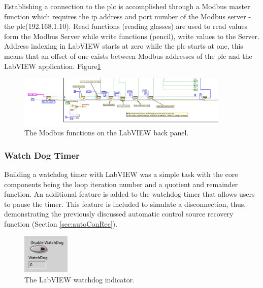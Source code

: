             Establishing a connection to the \acrshort{plc} is accomplished through a Modbus master function which requires the \acrshort{ip} address and port number of the Modbus server - the \acrshort{plc}(192.168.1.10). 
            Read functions (reading glasses) are used to read values form the Modbus Server while write functions (pencil), write values to the Server. Address indexing in LabVIEW starts at zero while the \acrshort{plc} starts at one, this means that an offset of one exists between Modbus addresses of the \acrshort{plc} and the LabVIEW application. Figure\ref{fig:modLabFun}
            
        \begin{figure}[H]
            \centering
            \includegraphics[width = 0.9\textwidth]{2_images/labViewModFunc}
            \caption{The Modbus functions on the LabVIEW back panel.}
            \label{fig:modLabFun}
        \end{figure}     
        
        \subsubsection{Watch Dog Timer}
            Building a watchdog timer with LabVIEW was a simple task with the core components being the loop iteration number and a quotient and remainder function. An additional feature is added to the watchdog timer that allows users to pause the timer. This feature is included to simulate a disconnection, thus, demonstrating the  previously discussed automatic control source recovery function (Section \ref{sec:autoConRec}).

        \begin{figure}[H]
            \centering
            \includegraphics[width = 0.2\textwidth]{2_images/labFrontWatchDog}
            \caption{The LabVIEW watchdog indicator.}
            \label{fig:labFrontWatchDog}
        \end{figure}    
            
